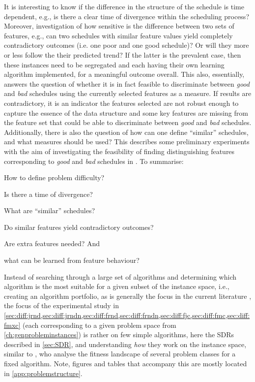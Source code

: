 It is interesting to know if the difference in the structure of the schedule is time dependent, e.g.,  is there a clear time of divergence within the scheduling process? 
Moreover, investigation of how sensitive is the difference between two sets of features, e.g.,  can two schedules with similar feature values yield completely contradictory outcomes (i.e. one poor and one good schedule)? Or will they more or less follow the their predicted trend? If the latter is the prevalent case, then these instances need to be segregated and each having their own learning algorithm implemented, for a meaningful outcome overall.  
This also, essentially, answers the question of whether  it is in fact feasible to discriminate between \emph{good} and \emph{bad} schedules using the currently selected features as a measure. If results are contradictory, it is an indicator the features selected are not robust enough to capture the essence of the data structure and some key features are missing from the feature set that could be able to discriminate between \emph{good} and \emph{bad} schedules. 
Additionally, there is also the question of how can one define ``similar'' schedules, and what measures should be used? This  describes some preliminary experiments with the aim of investigating the feasibility of finding distinguishing features corresponding to \emph{good} and \emph{bad} schedules in \jsp. To summarise:
\begin{inparaenum}[(a)]
	\item How to define problem difficulty? 
	\item Is there a time of divergence?
	\item What are ``similar'' schedules?
	\item Do similar features yield contradictory outcomes?
	\item Are extra features needed? 
	And \item what can be learned from feature behaviour?
\end{inparaenum}

Instead of searching through a large set of algorithms  and determining which algorithm is the most suitable for a given subset of the instance space, i.e., creating an algorithm portfolio, as is generally the focus in the current literature \citep{SmithMilesLion3,SmithMilesLion5,Corne10}, the focus of the experimental study in \cref{sec:diff:jrnd,sec:diff:jrndn,sec:diff:frnd,sec:diff:frndn,sec:diff:fjc,sec:diff:fmc,sec:diff:fmxc} 
(each corresponding to a given problem space from \cref{ch:genprobleminstances})
is rather on few simple algorithms, here the SDRs described in \cref{sec:SDR}, and understanding \emph{how} they work on the instance space, similar to \citet{Whitley}, who analyse the fitness landscape of several problem classes for a fixed algorithm. 
Note, figures and tables that accompany this  are mostly located in \cref{app:problemstructure}.


